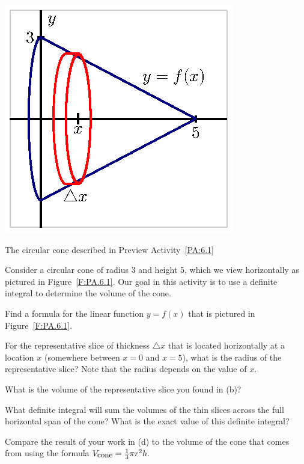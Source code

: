 \begin{marginfigure}[4cm]
\includegraphics{figures/6_2_PA1.eps}
\caption{The circular cone described in Preview Activity~\ref{PA:6.1}} \label{F:PA.6.1}
\end{marginfigure}


\begin{pa} \label{PA:6.1}  Consider a circular cone of radius $3$ and height $5$, which we view horizontally as pictured in Figure~\ref{F:PA.6.1}.  Our goal in this activity is to use a definite integral to determine the volume of the cone.

\ba
\item Find a formula for the linear function $y = f(x)$ that is pictured in Figure~\ref{F:PA.6.1}.
\item For the representative slice of thickness $\triangle x$ that is located horizontally at a location $x$ (somewhere between $x = 0$ and $x = 5$), what is the radius of the representative slice?  Note that the radius depends on the value of $x$.
\item What is the volume of the representative slice you found in (b)?
\item What definite integral will sum the volumes of the thin slices across the full horizontal span of the cone?  What is the exact value of this definite integral?
\item Compare the result of your work in (d) to the volume of the cone that comes from using the formula $V_{\text{\small{cone}}} = \frac{1}{3} \pi r^2 h.$
\ea
\end{pa} 
\afterpa
